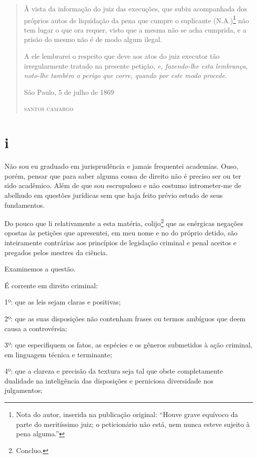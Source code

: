 \begin{quote}
À vista da informação do juiz das execuções, que subiu acompanhada dos
próprios autos de liquidação da pena que cumpre o suplicante
(N.A.)\footnote{Nota do autor, inserida na publicação original: ``Houve
  grave equívoco da parte do meritíssimo juiz; o peticionário não está,
  nem nunca esteve sujeito à pena alguma.''} não tem lugar o que ora
requer, visto que a mesma não se acha cumprida, e a prisão do mesmo não
é de modo algum ilegal.

A ele lembrarei o respeito que deve aos atos do juiz executor tão
irregularmente tratado na presente petição, \emph{e, fazendo-lhe esta
lembrança, noto-lhe também o perigo que corre, quando por este modo
procede}.

\begin{flushright}
São Paulo, 5 de julho de 1869

\textsc{santos camargo}
\end{flushright}
\end{quote}

\section{i}

Não sou eu graduado em jurisprudência e jamais frequentei academias.
Ouso, porém, pensar que para saber alguma cousa de direito não é preciso
ser ou ter sido acadêmico. Além de que sou escrupuloso e não costumo
intrometer-me de abelhudo em questões jurídicas sem que haja feito
prévio estudo de seus fundamentos.

Do pouco que li relativamente a esta matéria, colijo\footnote{Concluo.}
que as enérgicas negações opostas às petições que apresentei, em meu
nome e no do próprio detido, são inteiramente contrárias aos princípios
de legislação criminal e penal aceitos e pregados pelos mestres da
ciência.

Examinemos a questão.

É corrente em direito criminal:

1º: que as leis sejam claras e positivas;

2º: que as suas disposições não contenham frases ou termos ambíguos que
deem causa a controvérsia;

3º: que especifiquem os fatos, as espécies e os gêneros submetidos à
ação criminal, em linguagem técnica e terminante;

4º: que a clareza e precisão da textura seja tal que obste completamente
dualidade na inteligência das disposições e perniciosa diversidade nos
julgamentos;


